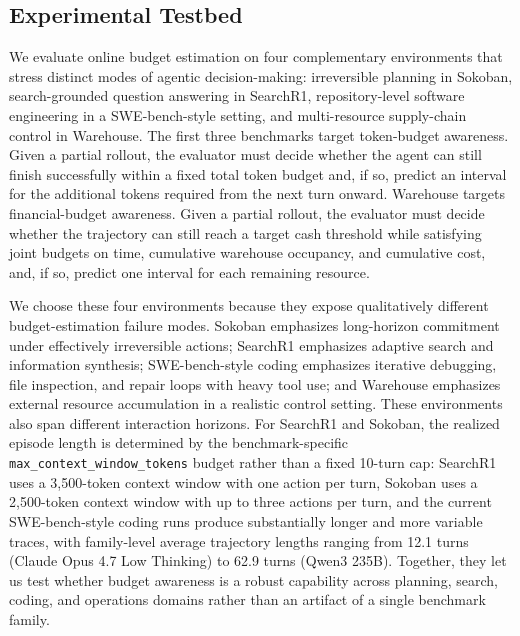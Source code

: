 
\subsection{Experimental Testbed}
\label{sec:experimental-testbed}

We evaluate online budget estimation on four complementary environments that stress distinct modes of agentic decision-making: irreversible planning in Sokoban, search-grounded question answering in SearchR1, repository-level software engineering in a SWE-bench-style setting, and multi-resource supply-chain control in Warehouse. The first three benchmarks target token-budget awareness. Given a partial rollout, the evaluator must decide whether the agent can still finish successfully within a fixed total token budget and, if so, predict an interval for the additional tokens required from the next turn onward. Warehouse targets financial-budget awareness. Given a partial rollout, the evaluator must decide whether the trajectory can still reach a target cash threshold while satisfying joint budgets on time, cumulative warehouse occupancy, and cumulative cost, and, if so, predict one interval for each remaining resource.

We choose these four environments because they expose qualitatively different budget-estimation failure modes. Sokoban emphasizes long-horizon commitment under effectively irreversible actions; SearchR1 emphasizes adaptive search and information synthesis; SWE-bench-style coding emphasizes iterative debugging, file inspection, and repair loops with heavy tool use; and Warehouse emphasizes external resource accumulation in a realistic control setting. These environments also span different interaction horizons. For SearchR1 and Sokoban, the realized episode length is determined by the benchmark-specific \texttt{max\_context\_window\_tokens} budget rather than a fixed 10-turn cap: SearchR1 uses a 3{,}500-token context window with one action per turn, Sokoban uses a 2{,}500-token context window with up to three actions per turn, and the current SWE-bench-style coding runs produce substantially longer and more variable traces, with family-level average trajectory lengths ranging from 12.1 turns (Claude Opus 4.7 Low Thinking) to 62.9 turns (Qwen3 235B). Together, they let us test whether budget awareness is a robust capability across planning, search, coding, and operations domains rather than an artifact of a single benchmark family.

